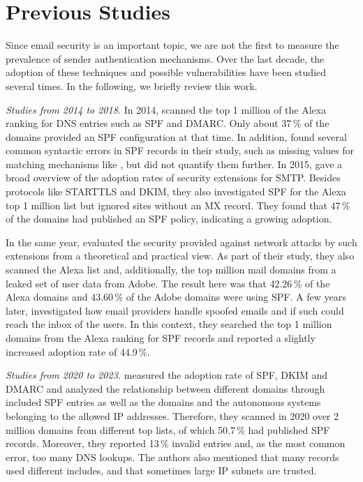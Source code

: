 \section{Previous Studies}
\label{sec:previous_work}
Since email security is an important topic, we are not the first to measure the prevalence of sender authentication mechanisms.
Over the last decade, the adoption of these techniques and possible vulnerabilities have been studied several times.
In the following, we briefly review this work.

\medskip
\emph{Studies from 2014 to 2018.}
In 2014, \citet{Gojmerac2015} scanned the top 1 million of the Alexa ranking for DNS entries such as SPF and DMARC.
Only about 37\,\% of the domains provided an SPF configuration at that time.
In addition, \citeauthor{Gojmerac2015} found several common syntactic errors in SPF records in their study, such as missing values for matching mechanisms like , but did not quantify them further.
In 2015, \citet{Durumeric_2015} gave a broad overview of the adoption rates of security extensions for \ac{SMTP}.
Besides protocols like STARTTLS and \ac{DKIM}, they also investigated \ac{SPF} for the Alexa top 1 million list but ignored sites without an MX record.
They found that 47\,\% of the domains had published an SPF policy, indicating a growing adoption.

In the same year, \citet{Foster_2015} evaluated the security provided against network attacks by such extensions from a theoretical and practical view.
As part of their study, they also scanned the Alexa list and, additionally, the top million mail domains from a leaked set of user data from Adobe.
The result here was that 42.26\,\% of the Alexa domains and 43.60\,\% of the Adobe domains were using \ac{SPF}.
A few years later, \citet{HuWan18} investigated how email providers handle spoofed emails and if such could reach the inbox of the users.
In this context, they searched the top 1 million domains from the Alexa ranking for \ac{SPF} records and reported a slightly increased adoption rate of 44.9\,\%. 

\medskip
\emph{Studies from 2020 to 2023.}
\citet{Tatang2021} measured the adoption rate of SPF, DKIM and DMARC and analyzed the relationship between different domains through included SPF entries as well as the domains and the autonomous systems belonging to the allowed IP addresses.
Therefore, they scanned in 2020 over 2 million domains from different top lists, of which 50.7\,\% had published SPF records.
Moreover, they reported 13\,\% invalid entries and, as the most common error, too many DNS lookups. %
The authors also mentioned that many records used different includes, and that sometimes large IP subnets are trusted.

